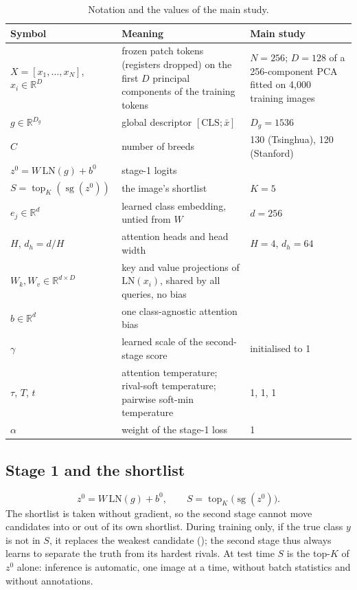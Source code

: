 \documentclass[11pt,a4paper]{article}
\theoremstyle{plain}
\newcommand{\fn}[1]{\texttt{\detokenize{#1}}}
\newcommand{\R}{\mathbb{R}}
\newcommand{\LN}{\mathrm{LN}}
\newcommand{\sg}{\operatorname{sg}}
\newcommand{\topk}{\operatorname{top}_K}
\begin{document}
\begin{table}[!htbp]
\centering
\caption{Notation and the values of the main study.}
\label{tab:notation}
\small
\begin{tabularx}{\textwidth}{@{}L{3.4cm}YL{5.0cm}@{}}
\toprule
Symbol & Meaning & Main study\\
\midrule
$X=[x_1,\dots,x_N]$, $x_i\in\R^D$ & frozen patch tokens (registers dropped) on the first $D$ principal components of
the training tokens & $N=256$; $D=128$ of a 256-component PCA fitted on 4,000 training images\\
$g\in\R^{D_g}$ & global descriptor $[\mathrm{CLS};\bar x]$ & $D_g=1536$\\
$C$ & number of breeds & 130 (Tsinghua), 120 (Stanford)\\
$z^0=W\,\LN(g)+b^0$ & stage-1 logits & \\
$S=\topk(\sg(z^0))$ & the image's shortlist & $K=5$\\
$e_j\in\R^d$ & learned class embedding, untied from $W$ & $d=256$\\
$H$, $d_h=d/H$ & attention heads and head width & $H=4$, $d_h=64$\\
$W_k,W_v\in\R^{d\times D}$ & key and value projections of $\LN(x_i)$, shared by all queries, no bias & \\
$b\in\R^d$ & one class-agnostic attention bias & \\
$\gamma$ & learned scale of the second-stage score & initialised to 1\\
$\tau$, $T$, $t$ & attention temperature; rival-soft temperature; pairwise soft-min temperature & 1, 1, 1\\
$\alpha$ & weight of the stage-1 loss & 1\\
\bottomrule
\end{tabularx}
\end{table}

\subsection{Stage 1 and the shortlist}\label{sec:stage1}
\begin{equation}
z^0=W\,\LN(g)+b^0,\qquad S=\topk\bigl(\sg(z^0)\bigr).
\label{eq:stage1}
\end{equation}
The shortlist is taken without gradient, so the second stage cannot move candidates into or out of its own
shortlist. During training only, if the true class $y$ is not in $S$, it replaces the weakest candidate
(\fn{gt_insert}); the second stage thus always learns to separate the truth from its hardest rivals. At test time
$S$ is the top-$K$ of $z^0$ alone: inference is automatic, one image at a time, without batch statistics and without
annotations.
\end{document}
